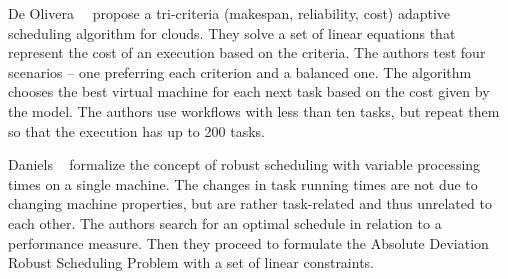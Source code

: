\documentclass[conference]{IEEEtran}
\newcommand{\new}[1]{{\color{blue}#1}}
\begin{document}
%
%
%

De Olivera~\etal~\cite{de2012provenance} propose a tri-criteria (makespan, reliability, cost) adaptive scheduling algorithm
for clouds.
They solve a set of linear equations that represent the cost of an execution based on the criteria.
The authors test four scenarios -- one preferring each criterion and a balanced one.
The algorithm chooses the best virtual machine for each next task based on the cost given by the model.
The authors use workflows with less than ten tasks, but repeat them so that the execution has up to 200 tasks.


Daniels \etal~\cite{daniels1995robust} formalize the concept of robust scheduling with variable processing times
on a single machine.
The changes in task running times are not due to changing machine properties, but are rather task-related
and thus unrelated to each other.
The authors search for an optimal schedule
in relation to a performance measure. %
Then they proceed to formulate the Absolute Deviation Robust Scheduling Problem \new{with} a set of linear constraints.
    
\end{document}
